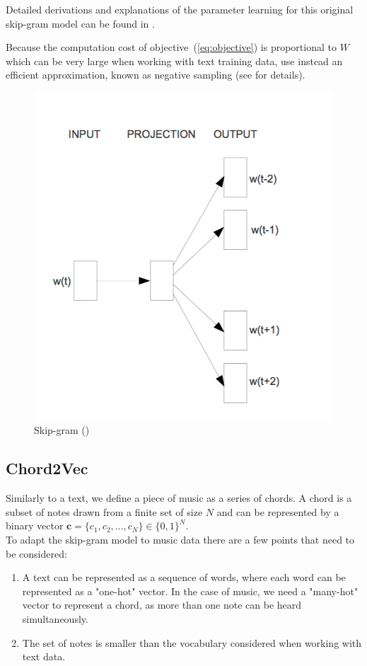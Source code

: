 \documentclass[12pt]{article}\pagestyle{myheadings}
\newcommand{\boldc}{\boldsymbol c}
\begin{document}
Detailed derivations and explanations of the parameter learning for this original skip-gram model can be found in \citep{Rong14}.

Because the computation cost of objective~(\ref{eq:objective}) is proportional to $W$ which can be very large when working with text training data, \citet{mik2013} use instead an efficient approximation, known as negative sampling (see \citep{NIPS2013_5021} for details). 

\begin{figure}[ht]
\centering
\includegraphics[width=.7\linewidth]{figures/skipgram.png}
\caption{\label{fig:skipgram}Skip-gram (\citet{mik2013})}
\end{figure}


\subsection{Chord2Vec}
Similarly to a text, we define a piece of music as a series of chords. A chord is a subset of notes drawn from a finite set of size $N$ and can be represented by a binary vector $\boldc = \{c_1, c_2, \ldots, c_N\}\in \{0,1\}^N$.\\

\noindent To adapt the skip-gram model to music data there are a few points that need to be considered:

\begin{enumerate}
\item A text can be represented as a sequence of words, where each word can be represented as a "one-hot" vector. In the case of music, we need a "many-hot" vector to represent a chord, as more than one note can be heard simultaneously.  
\item The set of notes is smaller than the vocabulary considered when working with text data.
\end{enumerate}
 
\end{document}
